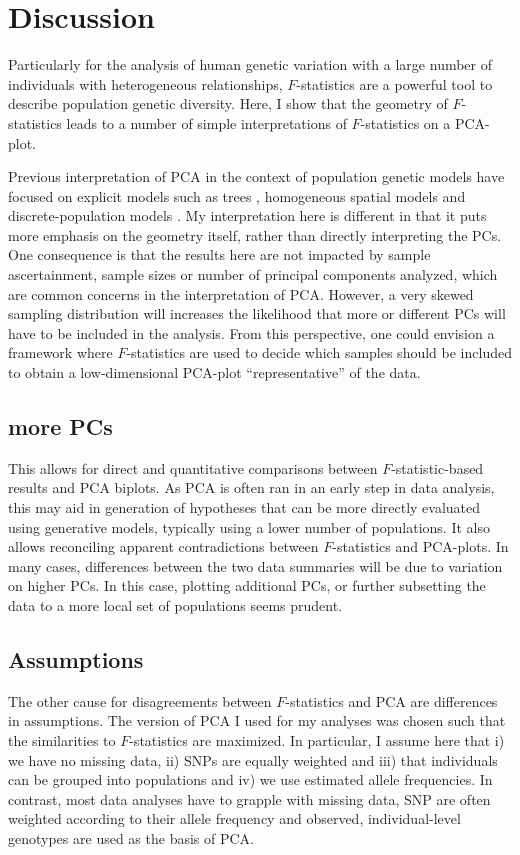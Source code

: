 \documentclass[12pt,fullpage, a4paper]{article}
\begin{document}
\section{Discussion}
Particularly for the analysis of human genetic variation with a large number of individuals with heterogeneous relationships, $F$-statistics  are  a powerful tool to describe population genetic diversity. Here, I show that the geometry of $F$-statistics \citep{oteo-garcia2021} leads to a number of simple interpretations of $F$-statistics on a PCA-plot. 

Previous interpretation of PCA in the context of population genetic models have focused on explicit models such as trees \citep{cavalli-sforza1975}, homogeneous spatial models \citep{novembre2008a} and discrete-population models \citep{francois2021}. My interpretation here is different in that it puts more emphasis on the geometry itself, rather than directly interpreting the PCs. One consequence is that the results here are not impacted by sample ascertainment, sample sizes or number of principal components analyzed, which are common concerns in the interpretation of PCA. However, a very skewed sampling distribution will increases the likelihood that more or different PCs will have to be included in the analysis. From this perspective, one could envision a framework where $F$-statistics are used to decide which samples should be included to obtain a low-dimensional PCA-plot ``representative'' of the data.



\subsection{more PCs}
This allows for direct and quantitative comparisons between $F$-statistic-based results and PCA biplots. As PCA is often ran in an early step in data analysis, this may aid in generation of hypotheses that can be more directly evaluated using generative models, typically using a lower number of populations. It also allows reconciling apparent contradictions between $F$-statistics and PCA-plots. In many cases, differences between the two data summaries will be due to variation on higher PCs. In this case, plotting additional PCs, or further subsetting the data to a more local set of populations seems prudent. 


\subsection{Assumptions}
The other cause for disagreements between $F$-statistics and PCA are differences in assumptions. The version of PCA I used for my analyses was chosen such that the similarities to $F$-statistics are maximized. In particular, I assume here that i) we have no missing data, ii) SNPs are equally weighted and iii) that individuals can be grouped into populations and iv) we use estimated allele frequencies. In contrast, most data analyses have to grapple with missing data, SNP are often weighted according to their allele frequency and observed, individual-level genotypes are used as the basis of PCA.
\end{document}
